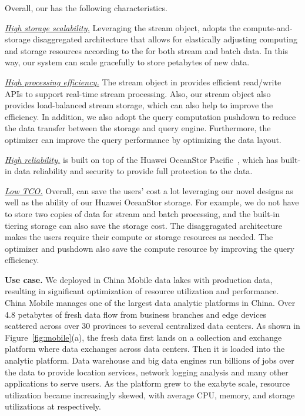 Overall, our \sys has the following characteristics.

\noindent \underline{\textit{High storage scalability.}} Leveraging the stream object, \sys adopts the compute-and-storage disaggregated architecture that allows for elastically adjusting computing and storage resources according to the   for both stream and batch data. In this way, our system can  scale gracefully to store petabytes of new data.

\noindent \underline{\textit{High processing efficiency.}} The  stream object in \sys provides efficient read/write APIs to support real-time stream processing. Also, our stream object also provides load-balanced stream storage, which can also help to improve the efficiency. In addition, we also  adopt the query computation pushdown to reduce the data transfer between the storage and query engine. Furthermore, the \brain optimizer can improve the query performance by optimizing the data layout. 

\noindent \underline{\textit{High reliability.}} \sys is built on top of the Huawei OceanStor Pacific~\cite{}, which has built-in data reliability and security to provide full protection to the data.

\noindent \underline{\textit{Low TCO.}} Overall, \sys can save the users' cost a lot leveraging  our novel designs as well as the ability of our Huawei OceanStor storage. For example, we do not have to store two copies of data for stream and batch processing, and the built-in tiering storage can also save the storage cost. The disaggragated architecture makes the users require their compute or storage resources as needed. The \brain optimizer and  pushdown also  save the compute resource by improving the query efficiency.

\noindent \textbf{Use case.} We deployed \sys  in China Mobile data lakes with production data, resulting in significant optimization of resource utilization and performance.  China Mobile manages one of the largest data analytic platforms in China.
Over 4.8 petabytes  of fresh data flow from business branches and edge devices scattered across over 30 provinces to several centralized data centers. As shown in Figure~\ref{fig:mobile}(a), the fresh data first lands on a collection and exchange platform where data exchanges across data centers. Then it is loaded into the analytic platform. Data warehouse and big data engines run billions of jobs  over the data to provide location services, network logging analysis and many other applications to serve users.
As the platform grew to the exabyte scale, resource utilization became increasingly skewed, with average CPU, memory, and storage utilizations at  respectively.




